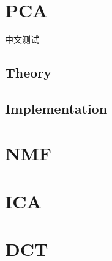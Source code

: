 \documentclass{ctexart}
\begin{document}
\section{PCA}
中文测试
\subsection{Theory}
\subsection{Implementation}

\section{NMF}

\section{ICA}

\section{DCT}
\end{document}
